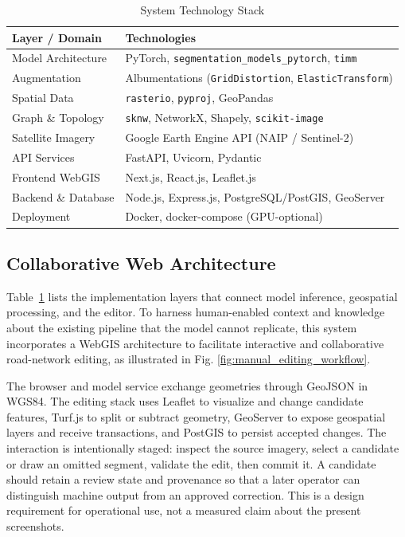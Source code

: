 \documentclass[10pt,a4paper,twocolumn]{article}
\begin{document}
\begin{table}[htbp]
\caption{System Technology Stack}
\begin{center}
\small
\begin{tabularx}{\linewidth}{>{\hsize=0.6\hsize\raggedright\arraybackslash}X >{\hsize=1.4\hsize\raggedright\arraybackslash}X}
\toprule
\textbf{Layer / Domain} & \textbf{Technologies} \\
\midrule
Model Architecture & PyTorch, \texttt{segmentation\_models\_pytorch}, \texttt{timm} \\
\addlinespace
Augmentation & Albumentations (\texttt{GridDistortion}, \texttt{ElasticTransform}) \\
\addlinespace
Spatial Data & \texttt{rasterio}, \texttt{pyproj}, GeoPandas \\
\addlinespace
Graph \& Topology & \texttt{sknw}, NetworkX, Shapely, \texttt{scikit-image} \\
\addlinespace
Satellite Imagery & Google Earth Engine API (NAIP / Sentinel-2) \\
\addlinespace
API Services & FastAPI, Uvicorn, Pydantic \\
\addlinespace
Frontend WebGIS & Next.js, React.js, Leaflet.js \\
\addlinespace
Backend \& Database & Node.js, Express.js, PostgreSQL/PostGIS, GeoServer \\
\addlinespace
Deployment & Docker, docker-compose (GPU-optional) \\
\bottomrule
\end{tabularx}
\label{tab:tech_stack}
\end{center}
\end{table}


\subsection{Collaborative Web Architecture}
Table~\ref{tab:tech_stack} lists the implementation layers that connect model inference, geospatial processing, and the editor.
To harness human-enabled context and knowledge about the existing pipeline that the model cannot replicate, this system incorporates a WebGIS architecture to facilitate interactive and collaborative road-network editing, as illustrated in Fig. \ref{fig:manual_editing_workflow}.

The browser and model service exchange geometries through GeoJSON in WGS84. The editing stack uses Leaflet to visualize and change candidate features, Turf.js to split or subtract geometry, GeoServer to expose geospatial layers and receive transactions, and PostGIS to persist accepted changes. The interaction is intentionally staged: inspect the source imagery, select a candidate or draw an omitted segment, validate the edit, then commit it. A candidate should retain a review state and provenance so that a later operator can distinguish machine output from an approved correction. This is a design requirement for operational use, not a measured claim about the present screenshots.
\end{document}
